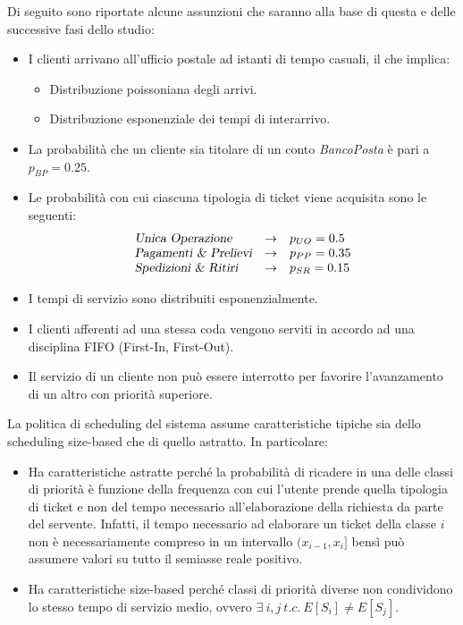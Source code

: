 Di seguito sono riportate alcune assunzioni che saranno alla base di questa e delle successive fasi dello studio:
\begin{itemize}
\item I clienti arrivano all'ufficio postale ad istanti di tempo casuali, il che implica:
\begin{itemize}
\item Distribuzione poissoniana degli arrivi.
\item Distribuzione esponenziale dei tempi di interarrivo.
\end{itemize}
\item La probabilità che un cliente sia titolare di un conto \textsl{BancoPosta} è pari a $p_{BP} = 0.25$.
\item Le probabilità con cui ciascuna tipologia di ticket viene acquisita sono le seguenti:
\begin{equation*}
\begin{array}{l c l}
\textsl{Unica Operazione}{} & \rightarrow & p_{UO} = 0.5 \\
\textsl{Pagamenti \& Prelievi}{} & \rightarrow & p_{PP} = 0.35 \\
\textsl{Spedizioni \& Ritiri}{} & \rightarrow & p_{SR} = 0.15
\end{array}
\end{equation*} 
\item I tempi di servizio sono distribuiti esponenzialmente.
\item I clienti afferenti ad una stessa coda vengono serviti in accordo ad una disciplina FIFO (First-In, First-Out).
\item Il servizio di un cliente non può essere interrotto per favorire l'avanzamento di un altro con priorità superiore.
\end{itemize}

La politica di scheduling del sistema assume caratteristiche tipiche sia dello scheduling size-based che di quello astratto. In particolare:
\begin{itemize}
\item Ha caratteristiche astratte perché la probabilità di ricadere in una delle classi di priorità è funzione della frequenza con cui l'utente prende quella tipologia di ticket e non del tempo necessario all'elaborazione della richiesta da parte del servente. Infatti, il tempo necessario ad elaborare un ticket della classe $i$ non è necessariamente compreso in un intervallo $(x_{i-1}, x_i]$ bensì può assumere valori su tutto il semiasse reale positivo. 
\item Ha caratteristiche size-based perché classi di priorità diverse non condividono lo stesso tempo di servizio medio, ovvero $\exists\ i,j\ t.c.\ E[S_i] \neq E[S_j]$.
\end{itemize}

